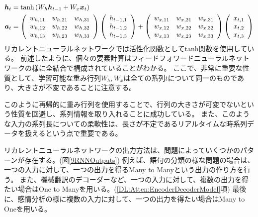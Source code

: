 \begin{equation}
 \begin{split}
  {\mbox{\boldmath{$h$}}}_t 
  &= \tanh{(W_h{\mbox{\boldmath{$h$}}}_{t-1}+W_x{\mbox{\boldmath{$x$}}}_t)}\\
  {\mbox{\boldmath{$a$}}}_t 
  &=
  \left(
    \begin{array}{ccc}
      w_{h,11} & w_{h,21} & w_{h,31} \\
      w_{h,12} & w_{h,22} & w_{h,32} \\
      w_{h,13} & w_{h,23} & w_{h,33}
    \end{array}
  \right)
  \left(
    \begin{array}{ccc}
      h_{t-1,1} \\
      h_{t-1,2} \\
      h_{t-1,3}
    \end{array}
  \right)
  +
  \left(
    \begin{array}{ccc}
      w_{x,11} & w_{x,21} & w_{x,31} \\
      w_{x,12} & w_{x,22} & w_{x,32} \\
      w_{x,13} & w_{x,23} & w_{x,33}
    \end{array}
  \right)
  \left(
    \begin{array}{ccc}
      x_{t,1} \\
      x_{t,2} \\
      x_{t,3}
    \end{array}
  \right)
 \end{split}
\end{equation}
リカレントニューラルネットワークでは活性化関数としてtanh関数を使用している。
前述したように、個々の要素計算はフィードフォワードニューラルネットワークの様に全結合で構成されていることがわかる。
ここで、非常に重要な性質として、学習可能な重み行列$W_{h}, W_{x}$は全ての系列$t$について同一のものであり、大きさが不変であることに注意する。

このように再帰的に重み行列を使用することで、行列の大きさが可変でないという性質を回避し、系列情報を取り入れることに成功している。
また、このような入力の系列長についての柔軟性は、長さが不定であるリアルタイムな時系列データを扱えるという点で重要である。

リカレントニューラルネットワークの出力方法は、問題によっていくつかのパターンが存在する。(図\ref{9RNNOutputs})
例えば、語句の分類の様な問題の場合は、一つの入力に対して、一つの出力を得るMany to Manyという出力の作り方を行う。
また、機械翻訳のデコーダーなど、一つの入力に対して、複数の出力を得たい場合はOne to Manyを用いる。(\ref{DL:Atten:EncoderDecoderModel}項)
最後に、感情分析の様に複数の入力に対して、一つの出力を得たい場合はMany to Oneを用いる。

